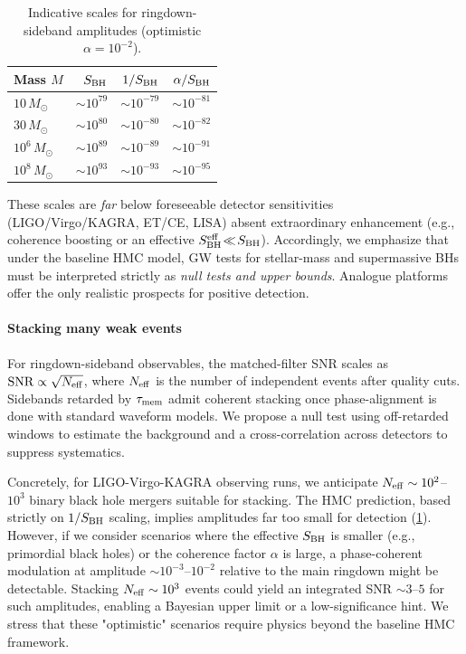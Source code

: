 \documentclass[a4paper,11pt]{article}
\newcommand{\eg}{e.g.\xspace}
\newcommand{\HMC}{\textsc{HMC}\xspace}
\theoremstyle{plain}
\theoremstyle{definition}
\theoremstyle{remark}
\begin{document}
\begin{table}[htbp]
\centering
\caption{Indicative scales for ringdown-sideband amplitudes (optimistic $\alpha=10^{-2}$).}
\label{tab:observability}
\footnotesize
\begin{tabular}{l r r r}
\toprule
Mass $M$ & $S_{\rm BH}$ & $1/S_{\rm BH}$ & $\alpha/S_{\rm BH}$ \\
\midrule
$10\,M_\odot$ & $\sim 10^{79}$ & $\sim 10^{-79}$ & $\sim 10^{-81}$ \\
$30\,M_\odot$ & $\sim 10^{80}$ & $\sim 10^{-80}$ & $\sim 10^{-82}$ \\
$10^6\,M_\odot$ & $\sim 10^{89}$ & $\sim 10^{-89}$ & $\sim 10^{-91}$ \\
$10^8\,M_\odot$ & $\sim 10^{93}$ & $\sim 10^{-93}$ & $\sim 10^{-95}$ \\
\bottomrule
\end{tabular}
\end{table}

These scales are \emph{far} below foreseeable detector sensitivities (LIGO/Virgo/KAGRA, ET/CE, LISA) absent extraordinary enhancement (\eg, coherence boosting or an effective $S_{\rm BH}^{\rm eff}\!\ll\!S_{\rm BH}$).
Accordingly, we emphasize that under the baseline \HMC{} model, GW tests for stellar-mass and supermassive BHs must be interpreted strictly as \emph{null tests and upper bounds}. Analogue platforms offer the only realistic prospects for positive detection.

\paragraph{Stacking many weak events}
For ringdown-sideband observables, the matched-filter SNR scales as ${\rm SNR}\propto \sqrt{N_{\rm eff}}$, where $N_{\rm eff}$ is the number of independent events after quality cuts. Sidebands retarded by $\tau_{\rm mem}$ admit coherent stacking once phase-alignment is done with standard waveform models. We propose a null test using off-retarded windows to estimate the background and a cross-correlation across detectors to suppress systematics.

Concretely, for LIGO-Virgo-KAGRA observing runs, we anticipate $N_{\rm eff} \sim 10^2$--$10^3$ binary black hole mergers suitable for stacking. The \HMC{} prediction, based strictly on $1/S_{\rm BH}$ scaling, implies amplitudes far too small for detection (\cref{tab:observability}). However, if we consider scenarios where the effective $S_{\rm BH}$ is smaller (\eg, primordial black holes) or the coherence factor $\alpha$ is large, a phase-coherent modulation at amplitude $\sim 10^{-3}$--$10^{-2}$ relative to the main ringdown might be detectable. Stacking $N_{\rm eff} \sim 10^3$ events could yield an integrated SNR $\sim 3$--$5$ for such amplitudes, enabling a Bayesian upper limit or a low-significance hint.
We stress that these "optimistic" scenarios require physics beyond the baseline \HMC{} framework.
\end{document}

